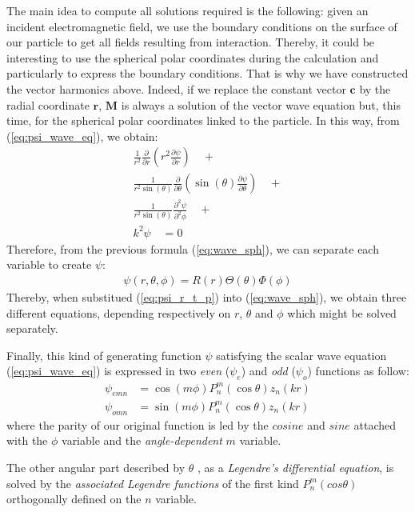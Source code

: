 \documentclass{article}
\numberwithin{equation}{section}
\begin{document}
The main idea to compute all solutions required is the following: given an incident electromagnetic field, we use the boundary conditions on the surface of our particle to get all fields resulting from interaction. Thereby, it could be interesting to use the spherical polar coordinates during the calculation and particularly to express the boundary conditions. That is why we have constructed the vector harmonics above. Indeed, if we replace the constant vector $\textbf{c}$ by the radial coordinate $\textbf{r}$, $\textbf{M}$ is always a solution of the vector wave equation but, this time, for the spherical polar coordinates linked to the particle. In this way, from (\ref{eq:psi_wave_eq}), we obtain:
\begin{equation}\label{eq:wave_sph}
\begin{aligned}
\frac{1}{r^{2}}\frac{\partial }{\partial r}\left(r^{2}\frac{\partial \psi}{\partial r}\right) \quad + \\ 
\frac{1}{r^{2}\sin(\theta)}\frac{\partial }{\partial \theta}\left(\sin(\theta)\frac{\partial \psi}{\partial \theta}\right) \quad + \\
\frac{1}{r^{2}\sin(\theta)}\frac{\partial^{2} \psi}{\partial^{2} \phi} \quad + \\
k^{2}\psi \quad = 0
\end{aligned}
\end{equation}
Therefore, from the previous formula (\ref{eq:wave_sph}), we can separate each variable to create $\psi$:
\begin{align}\label{eq:psi_r_t_p}
\psi(r, \theta, \phi) = R(r)\Theta(\theta)\Phi(\phi)
\end{align}
Thereby, when substitued (\ref{eq:psi_r_t_p}) into (\ref{eq:wave_sph}), we obtain three different equations, depending respectively on $r$, $\theta$ and $\phi$ which might be solved separately.

Finally, this kind of generating function $\psi$ satisfying the scalar wave equation (\ref{eq:psi_wave_eq}) is expressed in two \textit{even} ($\psi_{e}$) and \textit{odd} ($\psi_{o}$) functions as follow:
\begin{align}
\psi_{emn}&=\cos(m\phi)P_{n}^{m}(\cos\theta)z_{n}(kr)\\
\psi_{omn}&=\sin(m\phi)P_{n}^{m}(\cos\theta)z_{n}(kr)
\end{align}
where the parity of our original function is led by the $cosine$ and $sine$ attached with the $\phi$ variable and the \textit{angle-dependent} $m$ variable. 

The other angular part described by $\theta$ , as a \textit{Legendre's differential equation}, is solved by the \textit{associated Legendre functions} of the first kind $P_{n}^{m}(cos\theta)$ orthogonally defined on the $n$ variable. 
\end{document}
